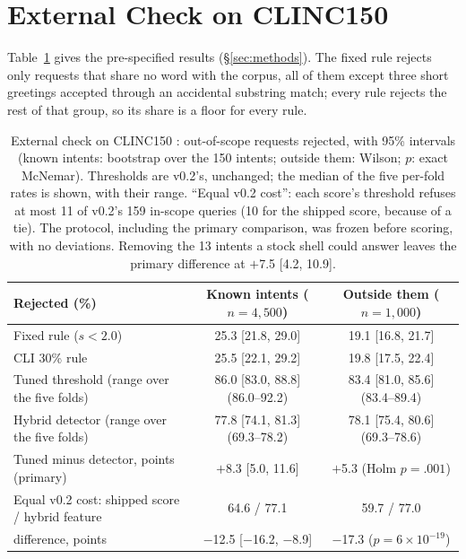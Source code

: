 \clearpage
\section{External Check on CLINC150}
\label{app:external}
Table~\ref{tab:external} gives the pre-specified results (\S\ref{sec:methods}). The fixed rule rejects only
requests that share no word with the corpus, all of them except three short greetings accepted through an
accidental substring match; every rule rejects the rest of that group, so its share is a floor for every rule.

\begin{table}[t]
  \centering
  \small
  \begin{tabular}{@{}lcc@{}}
    \toprule
    \textbf{Rejected (\%)} & \textbf{Known intents} ($n=4{,}500$) & \textbf{Outside them} ($n=1{,}000$) \\
    \midrule
    Fixed rule ($s<2.0$) & 25.3 [21.8, 29.0] & 19.1 [16.8, 21.7] \\
    CLI 30\% rule & 25.5 [22.1, 29.2] & 19.8 [17.5, 22.4] \\
    Tuned threshold (range over the five folds) & 86.0 [83.0, 88.8] (86.0--92.2) & 83.4 [81.0, 85.6] (83.4--89.4) \\
    Hybrid detector (range over the five folds) & 77.8 [74.1, 81.3] (69.3--78.2) & 78.1 [75.4, 80.6] (69.3--78.6) \\
    Tuned minus detector, points (primary) & $+$8.3 [5.0, 11.6] & $+$5.3 (Holm $p=.001$) \\
    Equal v0.2 cost: shipped score / hybrid feature & 64.6 / 77.1 & 59.7 / 77.0 \\
    \quad difference, points & $-$12.5 [$-$16.2, $-$8.9] & $-$17.3 ($p=6\times10^{-19}$) \\
    \bottomrule
  \end{tabular}
  \caption{External check on CLINC150 \citep{larson-etal-2019-evaluation}: out-of-scope requests rejected, with
  95\% intervals (known intents: bootstrap over the 150 intents; outside them: Wilson; $p$: exact McNemar).
  Thresholds are v0.2's, unchanged; the median of the five per-fold rates is shown, with their range. ``Equal
  v0.2 cost'': each score's threshold refuses at most 11 of v0.2's 159 in-scope queries (10 for the shipped
  score, because of a tie). The protocol, including the primary comparison, was frozen before scoring, with no
  deviations. Removing the 13 intents a stock shell could answer leaves the primary difference at $+$7.5 [4.2,
  10.9].}
  \label{tab:external}
\end{table}

